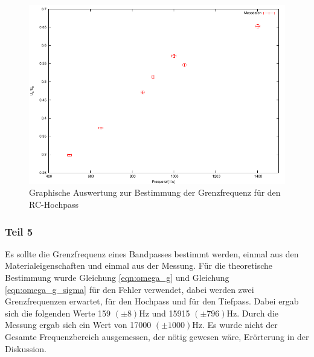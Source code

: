 \documentclass[12pt]{scrartcl}
\begin{document}
\begin{figure}[htbp] 
  \centering
    \includegraphics[scale = 1]{teil_4.pdf}
  	\caption[Graphische Auswertung zur Bestimmung der Grenzfrequenz für den RC-Hochpass]{Graphische Auswertung zur Bestimmung der Grenzfrequenz für den RC-Hochpass}
  \label{fig:teil_4}
\end{figure}

\newpage

\subsubsection{Teil 5}
Es sollte die Grenzfrequenz eines Bandpasses bestimmt werden, einmal aus den Materialeigenschaften und einmal aus der Messung. Für die theoretische Bestimmung wurde Gleichung \ref{eqn:omega_g} und Gleichung \ref{eqn:omega_g_sigma} für den Fehler verwendet, dabei werden zwei Grenzfrequenzen erwartet, für den Hochpass und für den Tiefpass. Dabei ergab sich die folgenden Werte 159 $(\pm 8)$Hz und 15915 $(\pm 796)$Hz. Durch die Messung ergab sich ein Wert von 17000 $(\pm 1000)$Hz. Es wurde nicht der Gesamte Frequenzbereich ausgemessen, der nötig gewesen wäre, Erörterung in der Diskussion.
\end{document}
